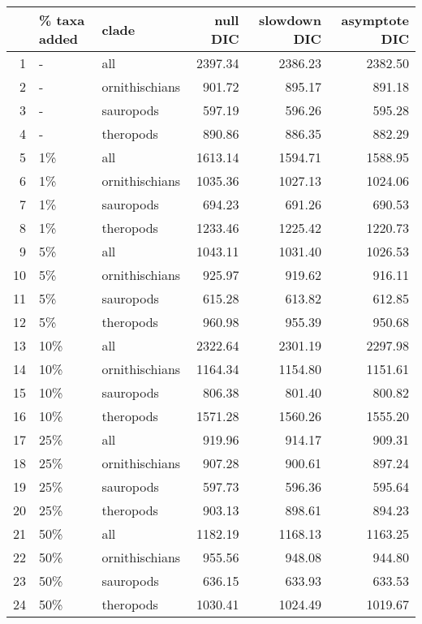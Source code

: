 \begin{table}[ht]
\centering
\begin{tabular}{rllrrr}
  \hline
 & \% taxa added & clade & null DIC & slowdown DIC & asymptote DIC \\ 
  \hline
1 & - & all & 2397.34 & 2386.23 & 2382.50 \\ 
  2 & - & ornithischians & 901.72 & 895.17 & 891.18 \\ 
  3 & - & sauropods & 597.19 & 596.26 & 595.28 \\ 
  4 & - & theropods & 890.86 & 886.35 & 882.29 \\ 
  5 & 1\% & all & 1613.14 & 1594.71 & 1588.95 \\ 
  6 & 1\% & ornithischians & 1035.36 & 1027.13 & 1024.06 \\ 
  7 & 1\% & sauropods & 694.23 & 691.26 & 690.53 \\ 
  8 & 1\% & theropods & 1233.46 & 1225.42 & 1220.73 \\ 
  9 & 5\% & all & 1043.11 & 1031.40 & 1026.53 \\ 
  10 & 5\% & ornithischians & 925.97 & 919.62 & 916.11 \\ 
  11 & 5\% & sauropods & 615.28 & 613.82 & 612.85 \\ 
  12 & 5\% & theropods & 960.98 & 955.39 & 950.68 \\ 
  13 & 10\% & all & 2322.64 & 2301.19 & 2297.98 \\ 
  14 & 10\% & ornithischians & 1164.34 & 1154.80 & 1151.61 \\ 
  15 & 10\% & sauropods & 806.38 & 801.40 & 800.82 \\ 
  16 & 10\% & theropods & 1571.28 & 1560.26 & 1555.20 \\ 
  17 & 25\% & all & 919.96 & 914.17 & 909.31 \\ 
  18 & 25\% & ornithischians & 907.28 & 900.61 & 897.24 \\ 
  19 & 25\% & sauropods & 597.73 & 596.36 & 595.64 \\ 
  20 & 25\% & theropods & 903.13 & 898.61 & 894.23 \\ 
  21 & 50\% & all & 1182.19 & 1168.13 & 1163.25 \\ 
  22 & 50\% & ornithischians & 955.56 & 948.08 & 944.80 \\ 
  23 & 50\% & sauropods & 636.15 & 633.93 & 633.53 \\ 
  24 & 50\% & theropods & 1030.41 & 1024.49 & 1019.67 \\ 
   \hline
\end{tabular}
\caption{} 
\end{table}

